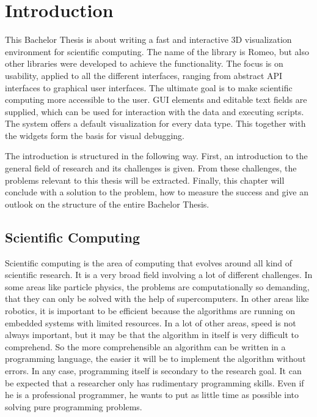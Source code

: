 \section{Introduction}
This Bachelor Thesis is about writing a fast and interactive 3D visualization environment for scientific computing.
The name of the library is Romeo, but also other libraries were developed to achieve the functionality. 
The focus is on usability, applied to all the different interfaces, ranging from abstract API interfaces to graphical user interfaces. 
The ultimate goal is to make scientific computing more accessible to the user.
\ac{GUI} elements and editable text fields are supplied, which can be used for interaction with the data and executing scripts.
The system offers a default visualization for every data type. This together with the widgets form the basis for visual debugging.

The introduction is structured in the following way.
First, an introduction to the general field of research and its challenges is given. 
From these challenges, the problems relevant to this thesis will be extracted.
Finally, this chapter will conclude with a solution to the problem, how to measure the success and give an outlook on the structure of the entire Bachelor Thesis.


\subsection{Scientific Computing}
Scientific computing is the area of computing that evolves around all kind of scientific research.
It is a very broad field involving a lot of different challenges. 
In some areas like particle physics, the problems are computationally so demanding, that they can only be solved with the help of supercomputers.
In other areas like robotics, it is important to be efficient because the algorithms are running on embedded systems with limited resources. 
In a lot of other areas, speed is not always important, but it may be that the algorithm in itself is very difficult to comprehend. 
So the more comprehensible an algorithm can be written in a programming language, the easier it will be to implement the algorithm without errors.
In any case, programming itself is secondary to the research goal.
It can be expected that a researcher only has rudimentary programming skills. 
Even if he is a professional programmer, he wants to put as little time as possible into solving pure programming problems.

